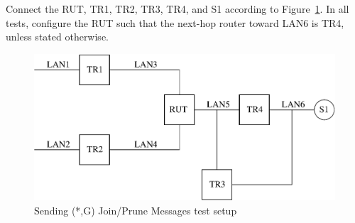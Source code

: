 \documentclass[11pt]{report}
\begin{document}
Connect the RUT, TR1, TR2, TR3, TR4, and S1 according to
Figure~\ref{fig:pim_test_4_6_sending_wc_join_prune_messages}.
In all tests, configure the RUT such that the next-hop router toward LAN6 is
TR4, unless stated otherwise.

\begin{figure}[htbp]
  \begin{center}
    \includegraphics[scale=0.8]{figs/pim_test_4_6_sending_wc_join_prune_messages}
    \caption{Sending (*,G) Join/Prune Messages test setup}
    \label{fig:pim_test_4_6_sending_wc_join_prune_messages}
  \end{center}
\end{figure}


\end{document}
